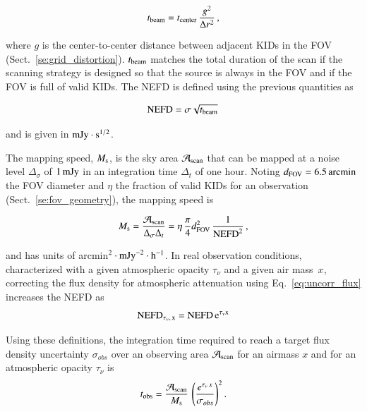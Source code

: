 \documentclass[traditionalabstract]{aa}
\newcommand{\taunu}{\tau_{\nu}}
\newcommand{\airmass}{air mass}
\begin{document}
\begin{equation}
  t_{\rm{beam}} = t_{\rm{center}}\, \frac{g^2}{\Delta r^2}\,,
\label{eq:t_det}
\end{equation}

where $g$ is the center-to-center distance between adjacent KIDs in the FOV
(Sect.~\ref{se:grid_distortion}). $t_{\rm{beam}}$ matches the total duration of
the scan if the scanning strategy is designed so that the source is always in
the FOV and if the FOV is full of valid KIDs. The NEFD is defined
using the previous quantities as 

\begin{equation}
  \rm{NEFD} = \sigma \sqrt{t_{\rm{beam}}}\, 
\label{eq:nefd_def}
\end{equation}

and is given in $\rm{mJy}\cdot s^{1/2}$.

The mapping speed, $M_{\rm{s}}$, is the sky area $\mathcal{A}_{\rm{scan}}$ that
can be mapped at a noise level $\Delta_\sigma$ of $1\,\rm{mJy}$ in an
integration time $\Delta_t$ of one hour. Noting $d_{\rm{FOV}} =
6.5\,\rm{arcmin}$ the FOV diameter and $\eta$ the fraction of valid KIDs for an
observation (Sect.~\ref{se:fov_geometry}), the mapping speed is

\begin{equation}
M_{\rm{s}} = \frac{\mathcal{A}_{\rm{scan}}}{\Delta_\sigma\Delta_t} = 
\eta \, \frac{\pi}{4} d_{\rm{FOV}}^2 \, \frac{1}{\rm{NEFD}^2}\, ,
\label{eq:mapping_speed}
\end{equation}

and has units of arcmin$^2 \cdot \rm{mJy}^{-2} \cdot \rm{h}^{-1}$. 
In real observation conditions, characterized with a given atmospheric
opacity $\taunu$ and a given \airmass\ $x$, correcting the flux
density for atmospheric attenuation using Eq.~\ref{eq:uncorr_flux}   
increases the NEFD as 
\begin{equation}
\rm{NEFD}_{\taunu,\, x} = \rm{NEFD}\, e^{\taunu x}
\label{eq:nefd_tau_el}
\end{equation}

Using these definitions, the integration time required to reach a target flux
density uncertainty $\sigma_{obs}$ over an observing area
$\mathcal{A}_{\rm{scan}}$ for an airmass $x$ and for an atmospheric opacity $\taunu$ is
\begin{equation}
  t_{\rm{obs}} = \frac{\mathcal{A}_{\rm{scan}}}{ M_{\rm{s}}} \, \left(\frac{e^{\taunu\, x}}{\sigma_{obs}}\right)^2.
\end{equation}
\end{document}

